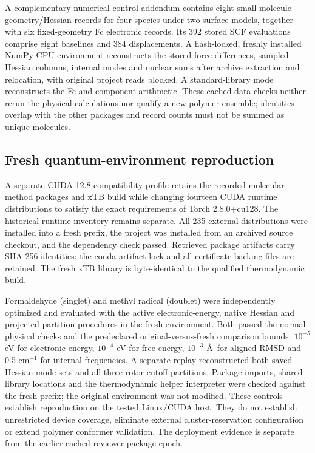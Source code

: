 \documentclass[11pt]{article}
\begin{document}
A complementary numerical-control addendum contains eight small-molecule geometry/Hessian records for four species under two surface models, together with six fixed-geometry Fc electronic records. Its 392 stored SCF evaluations comprise eight baselines and 384 displacements. A hash-locked, freshly installed NumPy CPU environment reconstructs the stored force differences, sampled Hessian columns, internal modes and nuclear sums after archive extraction and relocation, with original project reads blocked. A standard-library mode reconstructs the Fc and component arithmetic. These cached-data checks neither rerun the physical calculations nor qualify a new polymer ensemble; identities overlap with the other packages and record counts must not be summed as unique molecules.

\subsection{Fresh quantum-environment reproduction}
A separate CUDA 12.8 compatibility profile retains the recorded molecular-method packages and xTB build while changing fourteen CUDA runtime distributions to satisfy the exact requirements of Torch 2.8.0+cu128. The historical runtime inventory remains separate. All 235 external distributions were installed into a fresh prefix, the project was installed from an archived source checkout, and the dependency check passed. Retrieved package artifacts carry SHA-256 identities; the conda artifact lock and all certificate backing files are retained. The fresh xTB library is byte-identical to the qualified thermodynamic build.

Formaldehyde (singlet) and methyl radical (doublet) were independently optimized and evaluated with the active electronic-energy, native Hessian and projected-partition procedures in the fresh environment. Both passed the normal physical checks and the predeclared original-versus-fresh comparison bounds: $10^{-5}$ eV for electronic energy, $10^{-4}$ eV for free energy, $10^{-3}$ \AA\ for aligned RMSD and 0.5 cm$^{-1}$ for internal frequencies. A separate replay reconstructed both saved Hessian mode sets and all three rotor-cutoff partitions. Package imports, shared-library locations and the thermodynamic helper interpreter were checked against the fresh prefix; the original environment was not modified. These controls establish reproduction on the tested Linux/CUDA host. They do not establish unrestricted device coverage, eliminate external cluster-reservation configuration or extend polymer conformer validation. The deployment evidence is separate from the earlier cached reviewer-package epoch.
\end{document}

